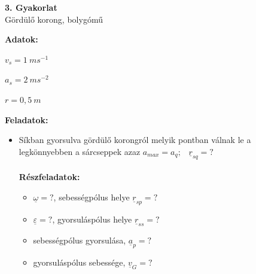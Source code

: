 \newpage
\begin{center}
    \large \textbf{3. Gyakorlat}\\
    Gördülő korong, bolygómű
\end{center}
\begin{tcolorbox}[colback=MidnightBlue!5!white,colframe=MidnightBlue!60!black,title= 1. Feladat{,} egyenes kényszerpályán gördülő korong]
        \textbf{Adatok:}
    \begin{center}
        \begin{multicols}{3}
            \(v_s = 1\ ms^{-1}\)
    
            \columnbreak
    
            \(a_s = 2\ ms^{-2}\)
    
            \columnbreak
    
            \(r = 0,5\ m\)
        \end{multicols}
    \end{center}
    \textbf{Feladatok:}
    \begin{itemize}
        \item Síkban gyorsulva gördülő korongról melyik pontban válnak le a legkönnyebben a sárcseppek azaz \(a_{max} = a_q ;\hspace{10pt} \underline{r}_{sq} = ?\)\\
        \\
        \textbf{Részfeladatok:}
        \begin{itemize}
            \item \(\underline{\omega} = ?\), sebességpólus helye \(\underline{r}_{sp} = ?\)
            \item \(\underline{\varepsilon} = ?\), gyorsuláspólus helye \(\underline{r}_{ss} = ?\)
            \item sebességpólus gyorsulása, \(\underline{a}_p = ?\)
            \item gyorsuláspólus sebessége, \(\underline{v}_G =?\)
        \end{itemize}
    \end{itemize}
\end{tcolorbox}
